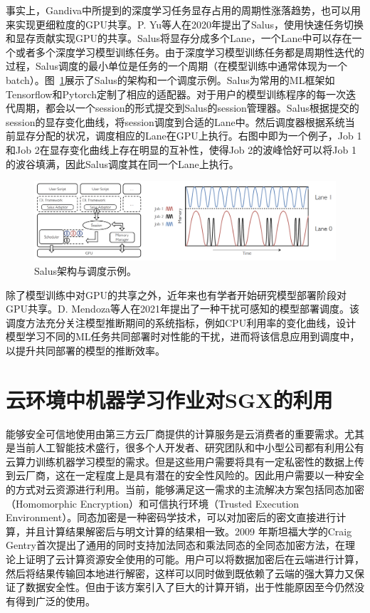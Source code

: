 事实上，Gandiva中所提到的深度学习任务显存占用的周期性涨落趋势，也可以用来实现更细粒度的GPU共享。P. Yu等人在2020年提出了Salus\parencite{yu2020salus}，使用快速任务切换和显存贡献实现GPU的共享。Salus将显存分成多个Lane，一个Lane中可以存在一个或者多个深度学习模型训练任务。由于深度学习模型训练任务都是周期性迭代的过程，Salus调度的最小单位是任务的一个周期（在模型训练中通常体现为一个batch）。图~\ref{salus_arch_sche}展示了Salus的架构和一个调度示例。Salus为常用的ML框架如Tensorflow和Pytorch定制了相应的适配器。对于用户的模型训练程序的每一次迭代周期，都会以一个session的形式提交到Salus的session管理器。Salus根据提交的session的显存变化曲线，将session调度到合适的Lane中。然后调度器根据系统当前显存分配的状况，调度相应的Lane在GPU上执行。右图中即为一个例子，Job 1 和Job 2在显存变化曲线上存在明显的互补性，使得Job 2的波峰恰好可以将Job 1的波谷填满，因此Salus调度其在同一个Lane上执行。

\begin{figure}[h]
    \centerline{\includegraphics[width=\textwidth]{figures/salus-arch-sche.png}}
    \caption{Salus架构与调度示例。}
    \label{salus_arch_sche}
\end{figure}

除了模型训练中对GPU的共享之外，近年来也有学者开始研究模型部署阶段对GPU共享。D. Mendoza等人\parencite{10.1145/3437984.3458837}在2021年提出了一种干扰可感知的模型部署调度。该调度方法充分关注模型推断期间的系统指标，例如CPU利用率的变化曲线，设计模型学习不同的ML任务共同部署时对性能的干扰，进而将该信息应用到调度中，以提升共同部署的模型的推断效率。

\section{云环境中机器学习作业对SGX的利用}
能够安全可信地使用由第三方云厂商提供的计算服务是云消费者的重要需求。尤其是当前人工智能技术盛行，很多个人开发者、研究团队和中小型公司都有利用公有云算力训练机器学习模型的需求。但是这些用户需要将具有一定私密性的数据上传到云厂商，这在一定程度上是具有潜在的安全性风险的。因此用户需要以一种安全的方式对云资源进行利用。当前，能够满足这一需求的主流解决方案包括同态加密（Homomorphic Encryption）和可信执行环境（Trusted Execution Environment）。同态加密是一种密码学技术，可以对加密后的密文直接进行计算，并且计算结果解密后与明文计算的结果相一致。2009 年斯坦福大学的Craig Gentry首次提出了通用的同时支持加法同态和乘法同态的全同态加密方法，在理论上证明了云计算资源安全使用的可能。用户可以将数据加密后在云端进行计算，然后将结果传输回本地进行解密，这样可以同时做到既依赖了云端的强大算力又保证了数据安全性。但由于该方案引入了巨大的计算开销，出于性能原因至今仍然没有得到广泛的使用。

